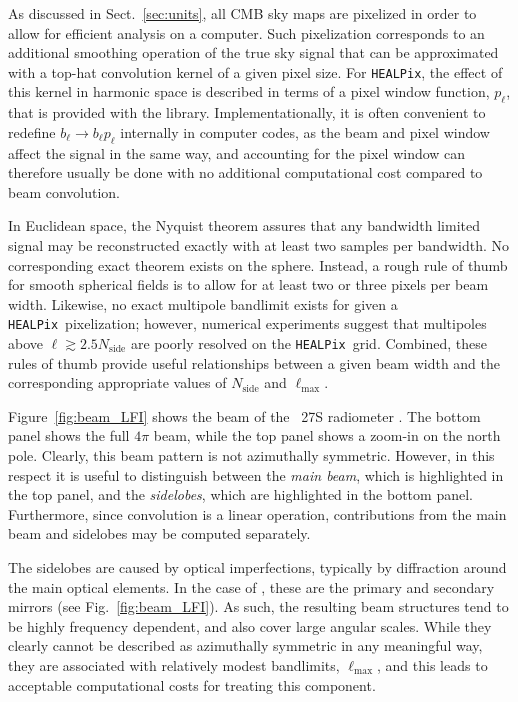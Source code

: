 \documentclass[twocolumn]{aa}
\newcommand{\HEALPix}[0]{\texttt{HEALPix}}
\begin{document}
As discussed in Sect.~\ref{sec:units}, all CMB sky maps are pixelized
in order to allow for efficient analysis on a computer. Such pixelization
corresponds to an additional smoothing operation of the true sky
signal that can be approximated with a top-hat convolution kernel of a
given pixel size. For \HEALPix, the effect of this kernel in harmonic
space is described in terms of a pixel window function, $p_{\ell}$,
that is provided with the library. Implementationally, it is often
convenient to redefine $b_{\ell} \rightarrow b_{\ell}p_{\ell}$
internally in computer codes, as the beam and pixel window affect the
signal in the same way, and accounting for the pixel window can
therefore usually be done with no additional computational cost
compared to beam convolution.

In Euclidean space, the Nyquist theorem assures that any bandwidth
limited signal may be reconstructed exactly with at least two samples
per bandwidth. No corresponding exact theorem exists on the
sphere. Instead, a rough rule of thumb for smooth spherical fields is
to allow for at least two or three pixels per beam width. Likewise, no
exact multipole bandlimit exists for given a \HEALPix\ pixelization;
however, numerical experiments suggest that multipoles above $\ell
\gtrsim 2.5N_{\mathrm{side}}$ are poorly resolved on the \HEALPix\ 
grid. Combined, these rules of thumb provide useful relationships
between a given beam width and the corresponding appropriate values of
$N_{\mathrm{side}}$ and $\ell_{\mathrm{max}}$. 

Figure~\ref{fig:beam_LFI} shows the beam of the \Planck\ 27S
radiometer \citep{planck2013-p02d}. The bottom panel shows the full
$4\pi$ beam, while the top panel shows a zoom-in on the north
pole. Clearly, this beam pattern is not azimuthally
symmetric. However, in this respect it is useful to distinguish
between the \emph{main beam}, which is highlighted in the top panel,
and the \emph{sidelobes}, which are highlighted in the bottom
panel. Furthermore, since convolution is a linear operation,
contributions from the main beam and sidelobes may be computed
separately.

The sidelobes are caused by optical imperfections,
typically by diffraction around the main optical elements. In the case
of \Planck, these are the primary and secondary mirrors (see
Fig.~\ref{fig:beam_LFI}). As such, the resulting beam structures tend
to be highly frequency dependent, and also cover large angular
scales. While they clearly cannot be described as azimuthally
symmetric in any meaningful way, they are associated with relatively
modest bandlimits, $\ell_{\mathrm{max}}$, and this leads to acceptable
computational costs for treating this component.
\end{document}
